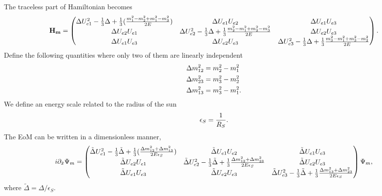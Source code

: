 \documentclass[letterpaper,12pt,english]{sphinxmanual}
\begin{document}
The traceless part of Hamiltonian becomes
\begin{gather}
\begin{split}\mathbf{H_{m}} = \begin{pmatrix}
\Delta U_{e1}^2 - \frac{1}{3}\Delta + \frac{1}{3}(\frac{m_1^2-m_2^2 + m_1^2-m_3^2}{2E}) & \Delta U_{e1}U_{e2} & \Delta U_{e1} U_{e3} \\
\Delta U_{e2} U_{e1} & \Delta U_{e2}^2 -\frac{1}{3}\Delta + \frac{1}{3}\frac{m_2^2 - m_1^2+m_2^2-m_3^2}{2E} & \Delta U_{e2}U_{e3} \\
\Delta U_{e1} U_{e3} & \Delta U_{e2} U_{e3} & \Delta U_{e3}^2 -\frac{1}{3} \Delta + \frac{1}{3} \frac{m_3^2 - m_1^2 + m_3^2-m_2^2 }{2E}
\end{pmatrix}.\end{split}\notag
\end{gather}
Define the following quantities where only two of them are linearly independent
\begin{gather}
\begin{split}\Delta m_{12}^2 & = m_2^2 - m_1^2 \\
\Delta m_{23}^2 & = m_3^2 - m_2^2 \\
\Delta m_{13}^2 & = m_3^2 - m_1^2.\end{split}\notag
\end{gather}
We define an energy scale related to the radius of the sun
\begin{gather}
\begin{split}\epsilon_S = \frac{1}{R_S}.\end{split}\notag
\end{gather}
The EoM can be written in a dimensionless manner,
\begin{gather}
\begin{split}i\partial_{\hat x} \Psi_{m} =  \begin{pmatrix}
\tilde\Delta U_{e1}^2 - \frac{1}{3}\tilde\Delta + \frac{1}{3}(\frac{\Delta m_{12}^2 + \Delta m_{13}^2}{2E\epsilon_S}) & \tilde\Delta U_{e1}U_{e2} & \tilde\Delta U_{e1} U_{e3} \\
\tilde\Delta U_{e2} U_{e1} & \tilde\Delta U_{e2}^2 -\frac{1}{3}\tilde\Delta + \frac{1}{3}\frac{\Delta m_{12}^2 + \Delta m_{23}^2}{2E\epsilon_S} & \tilde\Delta U_{e2}U_{e3} \\
\tilde\Delta U_{e1} U_{e3} & \tilde\Delta U_{e2} U_{e3} & \tilde\Delta U_{e3}^2 -\frac{1}{3} \tilde\Delta + \frac{1}{3} \frac{\Delta m_{13}^2 + \Delta m_{23}^2 }{2E\epsilon_S}
\end{pmatrix}\Psi_m ,\end{split}\notag
\end{gather}
where \(\tilde\Delta = \Delta/\epsilon_S\).
\end{document}
